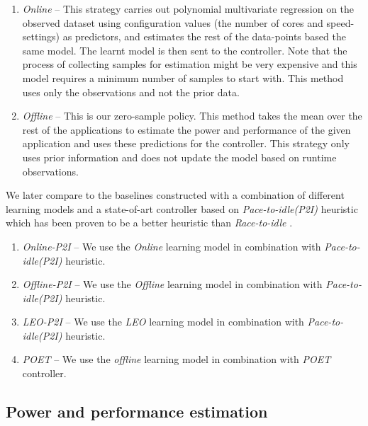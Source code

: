 \begin{enumerate}
\item \textit{Online} -- This strategy carries out polynomial
  multivariate regression on the observed dataset using configuration
  values (the number of cores and speed-settings) as
  predictors, and estimates the rest of the data-points based the same
  model. The learnt model is then sent to the controller. Note that the process of collecting samples for estimation might be very expensive and this model requires a minimum number of samples to start with. This method uses only the observations and
  not the prior data.
\item \textit{Offline} -- This is our zero-sample policy. This method takes the mean over the rest of the applications to estimate the power and performance of the given application and uses these predictions for the controller.
  This strategy only uses prior information and does not update the model
  based on runtime observations.
\end{enumerate}
We later compare \SYSTEM{} to the baselines constructed with a combination of different learning models and a state-of-art controller based on \emph{Pace-to-idle(P2I)} heuristic which has been proven to be a better heuristic than \emph{Race-to-idle} \cite{RACINGPACING}. 
\begin{enumerate}
\item \textit{Online-P2I} -- We use the \textit{Online} learning model in combination with  \emph{Pace-to-idle(P2I)} heuristic.
\item \textit{Offline-P2I} -- We use the \textit{Offline} learning model in combination with  \emph{Pace-to-idle(P2I)} heuristic.
\item \textit{LEO-P2I} -- We use the \textit{LEO} learning model in combination with  \emph{Pace-to-idle(P2I)} heuristic.
\item \textit{POET} -- We use the \textit{offline} learning model in combination with  \emph{POET} controller. 
\end{enumerate}

\subsection{Power and performance estimation}

